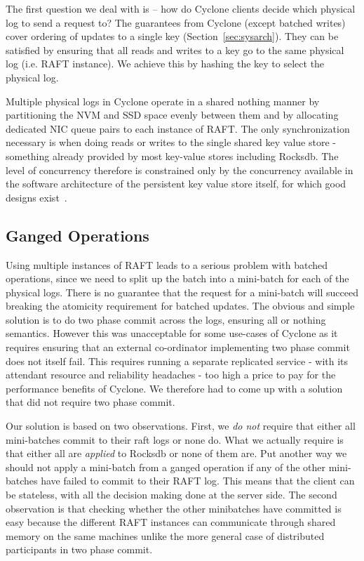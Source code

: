 \documentclass[letterpaper,twocolumn,10pt]{article}
\begin{document}
The first question we deal with is -- how do Cyclone clients decide
which physical log to send a request to? The guarantees from Cyclone
(except batched writes) cover ordering of updates to a single key
(Section~\ref{sec:sysarch}). They can be satisfied by ensuring that
all reads and writes to a key go to the same physical log (i.e. RAFT
instance). We achieve this by hashing the key to select the physical
log.

Multiple physical logs in Cyclone operate in a shared nothing manner
by partitioning the NVM and SSD space evenly between them and by
allocating dedicated NIC queue pairs to each instance of RAFT.  The
only synchronization necessary is when doing reads or writes to the
single shared key value store - something already provided by most
key-value stores including Rocksdb.  The level of concurrency
therefore is constrained only by the concurrency available in the
software architecture of the persistent key value store itself, for
which good designs exist~\cite{flodb}.

\subsection{Ganged Operations}
Using multiple instances of RAFT leads to a serious problem with
batched operations, since we need to split up the batch into a
mini-batch for each of the physical logs. There is no guarantee that
the request for a mini-batch will succeed breaking the atomicity
requirement for batched updates. The obvious and simple solution is to
do two phase commit across the logs, ensuring all or nothing
semantics. However this was unacceptable for some use-cases of Cyclone
as it requires ensuring that an external co-ordinator implementing two
phase commit does not itself fail. This requires running a separate
replicated service - with its attendant resource and reliability
headaches - too high a price to pay for the performance benefits of
Cyclone.  We therefore had to come up with a solution that did not
require two phase commit.

Our solution is based on two observations. First, we \emph {do not}
require that either all mini-batches commit to their raft logs or none
do. What we actually require is that either all are \emph{applied} to
Rocksdb or none of them are. Put another way we should not apply a
mini-batch from a ganged operation if any of the other mini-batches
have failed to commit to their RAFT log. This means that the client
can be stateless, with all the decision making done at the server
side. The second observation is that checking whether the other
minibatches have committed is easy because the different RAFT
instances can communicate through shared memory on the same machines
unlike the more general case of distributed participants in two phase
commit.
\end{document}

